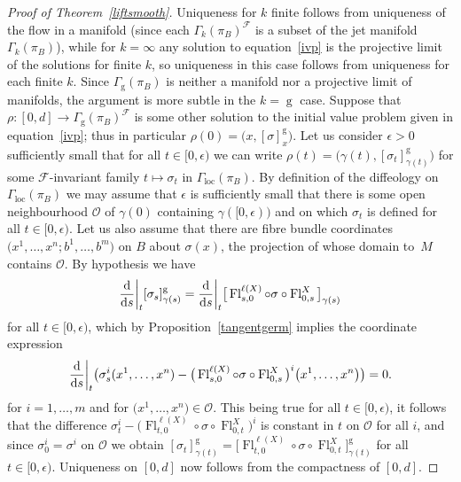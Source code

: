 \documentclass[pdftex]{sigma}
\numberwithin{equation}{section}
\def\loc{\operatorname{loc}}
\def\g{\operatorname{g}}
\def\Fl{\operatorname{Fl}}
\def\FF{{\mathcal{F}}}
\def\OO{{\mathcal{O}}}
\begin{document}
\begin{proof}[Proof of Theorem~\ref{liftsmooth}]
Uniqueness for $k$ finite follows from uniqueness of the flow in a manifold (since each $\Gamma_{k}(\pi_{B})^{\FF}$ is a subset of the jet manifold $\Gamma_{k}(\pi_{B})$), while for $k=\infty$ any solution to equation~\eqref{ivp} is the projective limit of the solutions for finite $k$, so uniqueness in this case follows from uniqueness for each finite $k$. Since $\Gamma_{\g}(\pi_{B})$ is neither a manifold nor a projective limit of manifolds, the argument is more subtle in the $k=\g$ case. Suppose that $\rho\colon [0,d]\rightarrow\Gamma_{\g}(\pi_{B})^{\FF}$ is some other solution to the initial value problem given in equation~\eqref{ivp}; thus in particular $\rho(0) = \big(x,[\sigma]^{\g}_{x}\big)$. Let us consider $\epsilon>0$ sufficiently small that for all $t\in[0,\epsilon)$ we can write $\rho(t) = \big(\gamma(t),[\sigma_{t}]^{\g}_{\gamma(t)}\big)$ for some $\FF$-invariant family $t\mapsto\sigma_{t}$ in $\Gamma_{\loc}(\pi_{B})$. By definition of the diffeology on $\Gamma_{\loc}(\pi_{B})$ we may assume that $\epsilon$ is sufficiently small that there is some open neighbourhood $\OO$ of $\gamma(0)$ containing $\gamma([0,\epsilon))$ and on which $\sigma_{t}$ is defined for all $t\in[0,\epsilon)$. Let us also assume that there are fibre bundle coordinates $\big(x^{1},\dots,x^{n};b^{1},\dots,b^{m}\big)$ on $B$ about $\sigma(x)$, the projection of whose domain to~$M$ contains $\OO$. By hypothesis we have\vspace{-1ex}
\begin{gather*}
\frac{\rm d}{{\rm d}s}\bigg|_{t}[\sigma_{s}]^{\g}_{\gamma(s)} = \frac{\rm d}{{\rm d}s}\bigg|_{t}\big[\Fl^{\ell(X)}_{s,0}\circ\sigma\circ\Fl^{X}_{0,s}\big]_{\gamma(s)}
\end{gather*}
for all $t\in[0,\epsilon)$, which by Proposition~\ref{tangentgerm} implies the coordinate expression\vspace{-1ex}
\begin{gather*}
\frac{\rm d}{{\rm d}s}\bigg|_{t}\big(\sigma^{i}_{s}(x^{1},\dots,x^{n})- \big(\Fl^{\ell(X)}_{s,0}\circ\sigma\circ\Fl^{X}_{0,s}\big)^{i}\big(x^{1},\dots,x^{n}\big)\big) = 0.
\end{gather*}
for $i=1,\dots,m$ and for $\big(x^{1},\dots,x^{n}\big)\in\OO$. This being true for all $t\in[0,\epsilon)$, it follows that the difference $\sigma^{i}_{t}-\big(\Fl^{\ell(X)}_{t,0}\circ\sigma\circ\Fl^{X}_{0,t}\big)^{i}$ is constant in $t$ on $\OO$ for all $i$, and since $\sigma^{i}_{0} = \sigma^{i}$ on $\OO$ we obtain $[\sigma_{t}]^{\g}_{\gamma(t)} = \big[\Fl^{\ell(X)}_{t,0}\circ\sigma\circ\Fl^{X}_{0,t}\big]^{\g}_{\gamma(t)}$ for all $t\in[0,\epsilon)$. Uniqueness on $[0,d]$ now follows from the compactness of $[0,d]$.



\end{proof}
\end{document}
